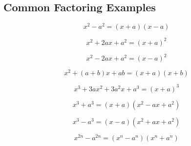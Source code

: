 \documentclass[12pt, a5paper]{article}
\begin{document}
\subsection*{Common Factoring Examples}
$$
x^2 - a^2 = (x + a)(x - a)
$$

$$
x^2 + 2ax + a^2 = (x + a)^2
$$

$$
x^2 - 2ax + a^2 = (x - a)^2
$$

$$
x^2 + (a + b)x + ab = (x + a)(x + b)
$$

$$
x^3 + 3ax^2 + 3a^2x + a^3 = (x + a)^3
$$

$$
x^3 + a^3 = (x + a)(x^2 - ax + a^2)
$$

$$
x^3 - a^3 = (x - a)(x^2 + ax + a^2)
$$

$$
x^{2n} - a^{2n} = (x^n - a^n)(x^n + a^n)
$$
\end{document}
